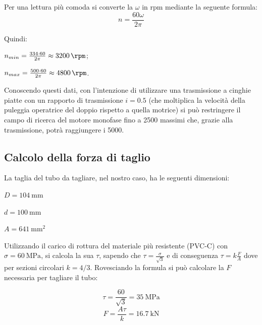 \documentclass{report}
\begin{document}
Per una lettura più comoda si converte la $\omega$ in rpm mediante la seguente formula:
\begin{equation}
  n = \frac{60\omega}{2\pi}
\end{equation}

Quindi:
\begin{description}
\item $n_{min} = \frac{334\cdot 60}{2\pi} \approx \SI{3200}{\rpm}$;
\item $n_{max} = \frac{500\cdot 60}{2\pi} \approx \SI{4800}{\rpm}$.
\end{description}

Conoscendo questi dati, con l’intenzione di utilizzare una trasmissione a cinghie piatte con un rapporto di trasmissione $i = \num{0,5}$ (che moltiplica la velocità della puleggia operatrice del doppio rispetto a quella motrice) si può restringere il campo di ricerca del motore monofase fino a \SI{2500}{\rpm} massimi che, grazie alla trasmissione, potrà raggiungere i \SI{5000}{\rpm}.

\subsection{Calcolo della forza di taglio}
La taglia del tubo da tagliare, nel nostro caso, ha le seguenti dimensioni:
\begin{description}
\item $D = \SI{104}{\mm}$
\item $d = \SI{100}{\mm}$
\item $A = \SI{641}{\mm\squared}$
\end{description}

Utilizzando il carico di rottura del materiale più resistente (PVC-C) con $\sigma = \SI{60}{\MPa}$, si calcola la sua $\tau$, sapendo che $\tau = \frac{\sigma}{\sqrt{3}}$ e di conseguenza $\tau = k\frac{F}{A}$ dove per sezioni circolari $k=4/3$. Rovesciando la formula si può calcolare la $F$ necessaria per tagliare il tubo:

\begin{equation}
\tau=\frac{60}{\sqrt{3}} = \SI{35}{\MPa}
\end{equation}
\begin{equation}
F = \frac{A\tau}{k} = \SI{16,7}{\kN}
\end{equation}
\end{document}
